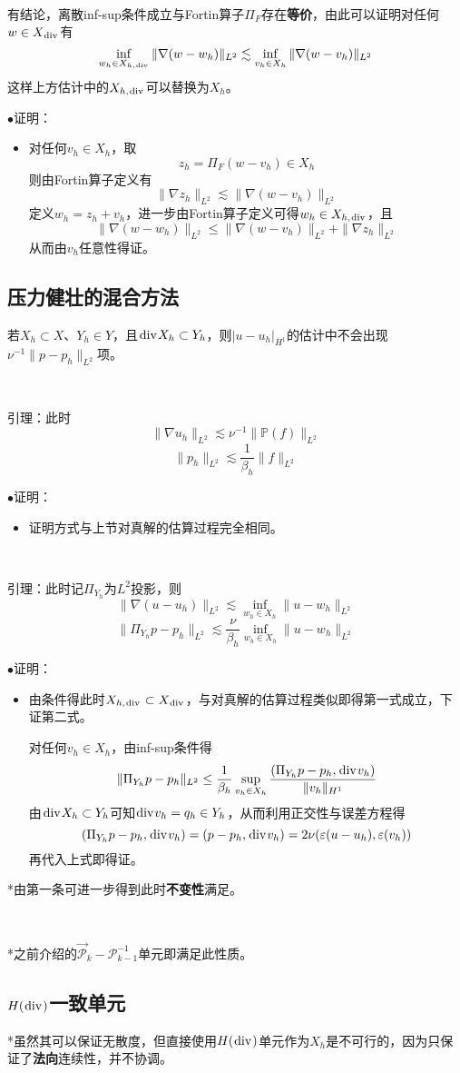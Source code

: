 \documentclass[a4paper,UTF8,fontset=windows]{ctexart}
\newcommand*{\cp}{\mathcal{P}}
\renewcommand*{\div}{\hspace{0.07em}\mathrm{div}\hspace{0.07em}}
\newcommand{\proo}[1]{{\kaishu $\bullet$证明：
\begin{itemize}
    \item[] #1
\end{itemize}
}}
\begin{document}
\

有结论，离散inf-sup条件成立与Fortin算子$\Pi_F$存在\textbf{等价}，由此可以证明对任何$w\in X_{\div}$有
$$\inf_{w_h\in X_{h,\div}}\|\nabla(w-w_h)\|_{L^2}\lesssim\inf_{v_h\in X_h}\|\nabla(w-v_h)\|_{L^2}$$
这样上方估计中的$X_{h,\div}$可以替换为$X_h$。

\proo{
    对任何$v_h\in X_h$，取
    $$z_h=\Pi_F(w-v_h)\in X_h$$
    则由Fortin算子定义有
    $$\|\nabla z_h\|_{L^2}\lesssim\|\nabla(w-v_h)\|_{L^2}$$
    定义$w_h=z_h+v_h$，进一步由Fortin算子定义可得$w_h\in X_{h,\div}$，且
    $$\|\nabla(w-w_h)\|_{L^2}\le\|\nabla(w-v_h)\|_{L^2}+\|\nabla z_h\|_{L^2}$$
    从而由$v_h$任意性得证。
}

\subsection{压力健壮的混合方法}
若$X_h\subset X$、$Y_h\in Y$，且$\div X_h\subset Y_h$，则$|u-u_h|_{H^1}$的估计中不会出现$\nu^{-1}\|p-p_h\|_{L^2}$项。

\

引理：此时
$$\|\nabla u_h\|_{L^2}\lesssim\nu^{-1}\|\mathbb{P}(f)\|_{L^2}$$
$$\|p_h\|_{L^2}\lesssim\frac{1}{\beta_h}\|f\|_{L^2}$$

\proo{
    证明方式与上节对真解的估算过程完全相同。
}

\

引理：此时记$\Pi_{Y_h}$为$L^2$投影，则
$$\|\nabla(u-u_h)\|_{L^2}\lesssim\inf_{w_h\in X_h}\|u-w_h\|_{L^2}$$
$$\|\Pi_{Y_h}p-p_h\|_{L^2}\lesssim\frac{\nu}{\beta_h}\inf_{w_h\in X_h}\|u-w_h\|_{L^2}$$

\proo{
    由条件得此时$X_{h,\div}\subset X_{\div}$，与对真解的估算过程类似即得第一式成立，下证第二式。

    对任何$v_h\in X_h$，由inf-sup条件得
    $$\|\Pi_{Y_h}p-p_h\|_{L^2}\le\frac{1}{\beta_h}\sup_{v_h\in X_h}\frac{(\Pi_{Y_h}p-p_h,\div v_h)}{\|v_h\|_{H^1}}$$
    由$\div X_h\subset Y_h$可知$\div v_h=q_h\in Y_h$，从而利用正交性与误差方程得
    $$(\Pi_{Y_h}p-p_h,\div v_h)=(p-p_h,\div v_h)=2\nu(\varepsilon(u-u_h),\varepsilon(v_h))$$
    再代入上式即得证。
}

*由第一条可进一步得到此时\textbf{不变性}满足。

\

*之前介绍的$\vec{\cp}_k-\cp_{k-1}^{-1}$单元即满足此性质。

\subsection{$H(\div)$一致单元}
*虽然其可以保证无散度，但直接使用$H(\div)$单元作为$X_h$是不可行的，因为只保证了\textbf{法向}连续性，并不协调。
\end{document}
